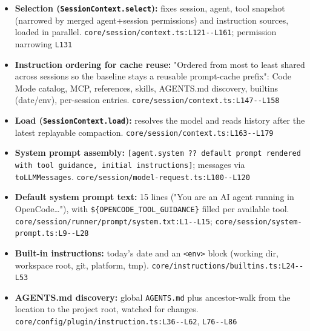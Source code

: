 \begin{itemize}
\item \textbf{Selection (\texttt{SessionContext.\allowbreak{}select}):} fixes session, agent, tool snapshot (narrowed by merged agent+session permissions) and instruction sources, loaded in parallel. \texttt{core/\allowbreak{}session/\allowbreak{}context.\allowbreak{}ts:\allowbreak{}L121-\allowbreak{}-\allowbreak{}L161}; permission narrowing \texttt{L131}
\item \textbf{Instruction ordering for cache reuse:} "Ordered from most to least shared across sessions so the baseline stays a reusable prompt-cache prefix": Code Mode catalog, MCP, references, skills, AGENTS.md discovery, builtins (date/env), per-session entries. \texttt{core/\allowbreak{}session/\allowbreak{}context.\allowbreak{}ts:\allowbreak{}L147-\allowbreak{}-\allowbreak{}L158}
\item \textbf{Load (\texttt{SessionContext.\allowbreak{}load}):} resolves the model and reads history after the latest replayable compaction. \texttt{core/\allowbreak{}session/\allowbreak{}context.\allowbreak{}ts:\allowbreak{}L163-\allowbreak{}-\allowbreak{}L179}
\item \textbf{System prompt assembly:} \texttt{[agent.\allowbreak{}system ?? default prompt rendered with tool guidance, initial instructions]}; messages via \texttt{toLLMMessages}. \texttt{core/\allowbreak{}session/\allowbreak{}model-\allowbreak{}request.\allowbreak{}ts:\allowbreak{}L100-\allowbreak{}-\allowbreak{}L120}
\item \textbf{Default system prompt text:} 15 lines ("You are an AI agent running in OpenCode\ldots{}"), with \texttt{\$\{OPENCODE\_\allowbreak{}TOOL\_\allowbreak{}GUIDANCE\}} filled per available tool. \texttt{core/\allowbreak{}session/\allowbreak{}runner/\allowbreak{}prompt/\allowbreak{}system.\allowbreak{}txt:\allowbreak{}L1-\allowbreak{}-\allowbreak{}L15}; \texttt{core/\allowbreak{}session/\allowbreak{}system-\allowbreak{}prompt.\allowbreak{}ts:\allowbreak{}L9-\allowbreak{}-\allowbreak{}L28}
\item \textbf{Built-in instructions:} today's date and an \texttt{<env>} block (working dir, workspace root, git, platform, tmp). \texttt{core/\allowbreak{}instructions/\allowbreak{}builtins.\allowbreak{}ts:\allowbreak{}L24-\allowbreak{}-\allowbreak{}L53}
\item \textbf{AGENTS.md discovery:} global \texttt{AGENTS.\allowbreak{}md} plus ancestor-walk from the location to the project root, watched for changes. \texttt{core/\allowbreak{}config/\allowbreak{}plugin/\allowbreak{}instruction.\allowbreak{}ts:\allowbreak{}L36-\allowbreak{}-\allowbreak{}L62}, \texttt{L76-\allowbreak{}-\allowbreak{}L86}

\end{itemize}
